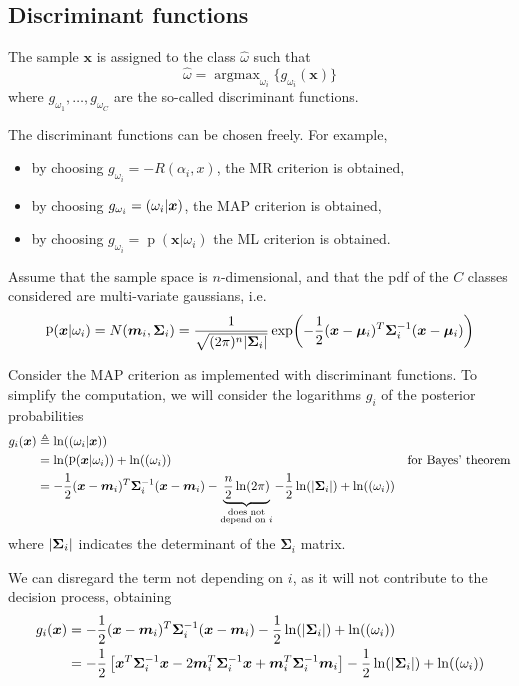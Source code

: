 \documentclass[oneside,onecolumn]{report}
\DeclareMathOperator*{\argmax}{argmax}
\DeclareMathOperator*{\pdf}{p}
\let\P\relax
\DeclareMathOperator*{\P}{P}
\begin{document}
\subsection{Discriminant functions}
The sample $\bm x$ is assigned to the class $\widehat \omega$ such that
$$ \widehat \omega = \argmax_{\omega_i} \{ g_{\omega_i}(\bm x) \} $$
where $g_{\omega_1}, \dots, g_{\omega_C}$ are the so-called discriminant functions.

The discriminant functions can be chosen freely.
For example,
\begin{itemize}
    \item by choosing $g_{\omega_i} = -R(\alpha_i, x)$, the MR criterion is obtained,
    \item by choosing $g_{\omega_i} = \P(\omega_i | \bm x)$, the MAP criterion is obtained,
    \item by choosing $g_{\omega_i} = \pdf(\bm x | \omega_i)$ the ML criterion is obtained.
\end{itemize}

Assume that the sample space is $n$-dimensional, and that the pdf of the $C$ classes considered are multi-variate gaussians, i.e.
$$ \pdf(\bm x | \omega_i) = N(\bm m_i, \bm \Sigma_i) = \frac{1}{\sqrt{(2 \pi)^n \abs{\bm \Sigma_i}}} \exp(-\frac{1}{2} (\bm x - \bm \mu_i)^T \bm \Sigma_i^{-1} (\bm x - \bm \mu_i)) $$

Consider the MAP criterion as implemented with discriminant functions.
To simplify the computation, we will consider the logarithms $g_i$ of the posterior probabilities
\begin{align*}
    g_i(\bm x)
    &\triangleq \ln(\P(\omega_i | \bm x)) \\
    &= \ln(\pdf(\bm x | \omega_i)) + \ln(\P(\omega_i)) & \text{for Bayes' theorem} \\
    &= -\frac{1}{2} (\bm x - \bm m_i)^T \bm \Sigma_i^{-1} (\bm x - \bm m_i) - \underbrace{\frac{n}{2} \ln(2 \pi)}_{\substack{\text{does not} \\ \text{depend on } i}} - \frac{1}{2} \ln(\abs{\bm \Sigma_i}) + \ln(\P(\omega_i))
\end{align*}
where $\abs{\bm \Sigma_i}$ indicates the determinant of the $\bm \Sigma_i$ matrix.

We can disregard the term not depending on $i$, as it will not contribute to the decision process, obtaining
\begin{align*}
    g_i(\bm x)
    &= -\frac{1}{2} (\bm x - \bm m_i)^T \bm \Sigma_i^{-1} (\bm x - \bm m_i) - \frac{1}{2} \ln(\abs{\bm \Sigma_i}) + \ln(\P(\omega_i)) \\
    &= -\frac{1}{2} \left[ \bm x^T \bm \Sigma_i^{-1} \bm x - 2 \bm m_i^T \bm \Sigma_i^{-1} \bm x + \bm m_i^T \bm \Sigma_i^{-1} \bm m_i \right] - \frac{1}{2} \ln(\abs{\bm \Sigma_i}) + \ln(\P(\omega_i))
\end{align*}
\end{document}
